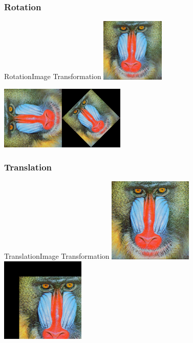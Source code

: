 \documentclass{beamer}
\begin{document}
\subsubsection{Rotation}
\begin{frame}{Rotation}{Image Transformation}
\centering
    \includegraphics[width=30mm]{images/baboon.jpg} 

\centering    
    \includegraphics[width=30mm]{images/rotated90.png}\includegraphics[width=30mm]{images/rotated45.png}

\end{frame}

\subsubsection{Translation}
\begin{frame}{Translation}{Image Transformation}
\centering \includegraphics[width=40mm]{images/baboon.jpg}\includegraphics[width=40mm]{images/translated.png}

\end{frame}
\end{document}
